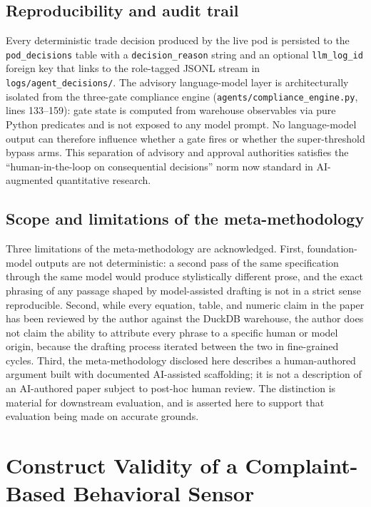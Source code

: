 \documentclass[11pt,letterpaper]{article}
\begin{document}
\subsection{Reproducibility and audit trail}
Every deterministic trade decision produced by the live pod is
persisted to the \texttt{pod\_decisions} table with a
\texttt{decision\_reason} string and an optional
\texttt{llm\_log\_id} foreign key that links to the role-tagged
JSONL stream in \texttt{logs/agent\_decisions/}. The advisory
language-model layer is architecturally isolated from the
three-gate compliance engine
(\texttt{agents/compliance\_engine.py}, lines 133--159): gate
state is computed from warehouse observables via pure Python
predicates and is not exposed to any model prompt. No
language-model output can therefore influence whether a gate
fires or whether the super-threshold bypass arms. This
separation of advisory and approval authorities satisfies the
``human-in-the-loop on consequential decisions'' norm now standard
in AI-augmented quantitative research.

\subsection{Scope and limitations of the meta-methodology}
Three limitations of the meta-methodology are acknowledged.
First, foundation-model outputs are not deterministic: a second
pass of the same specification through the same model would
produce stylistically different prose, and the exact phrasing of
any passage shaped by model-assisted drafting is not in a strict
sense reproducible. Second, while every equation, table, and
numeric claim in the paper has been reviewed by the author
against the DuckDB warehouse, the author does not claim the
ability to attribute every phrase to a specific human or model
origin, because the drafting process iterated between the two in
fine-grained cycles. Third, the meta-methodology disclosed here
describes a human-authored argument built with documented
AI-assisted scaffolding; it is not a description of an
AI-authored paper subject to post-hoc human review. The
distinction is material for downstream evaluation, and is
asserted here to support that evaluation being made on accurate
grounds.


\section{Construct Validity of a Complaint-Based Behavioral Sensor}
\label{sec:construct}
\end{document}
